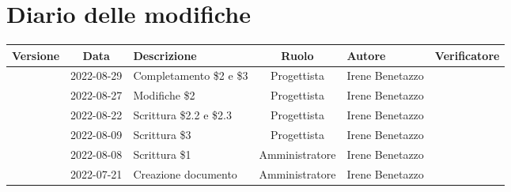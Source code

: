 \section*{Diario delle modifiche}
	\begin{center}
	\renewcommand{\arraystretch}{1.8} %
	\begin{longtable}{ |c|c|p{8em}|c|m{5em}|m{6em}| }
	\hline
	\textbf{Versione} & \textbf{Data} & \textbf{Descrizione} &  \textbf{Ruolo} &  \textbf{Autore} & \textbf{Verificatore}\\ %
	\hline %
	& 2022-08-29 & Completamento \$2 e \$3 & Progettista & Irene \newline Benetazzo & \\ 
	\hline
	& 2022-08-27 & Modifiche \$2 & Progettista & Irene \newline Benetazzo & \\ 
	\hline
	& 2022-08-22 & Scrittura \$2.2 e \$2.3 & Progettista & Irene \newline Benetazzo & \\ 
	\hline
    & 2022-08-09 & Scrittura \$3 & Progettista & Irene \newline Benetazzo & \\ 
	\hline
	& 2022-08-08 & Scrittura \$1 & Amministratore & Irene \newline Benetazzo & \\ 
	\hline
	& 2022-07-21 & Creazione documento & Amministratore & Irene \newline Benetazzo & \\ 
	\hline
	\end{longtable}
	\end{center}
	\newpage